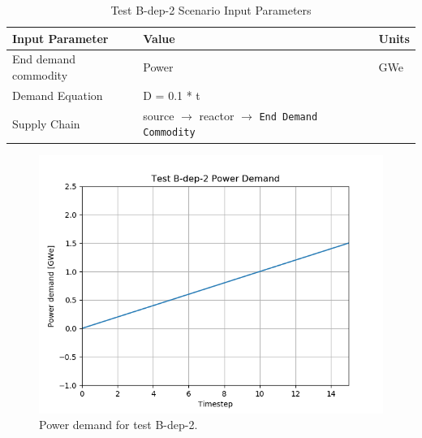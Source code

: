 \documentclass[11pt,letterpaper]{article}
\begin{document}
\begin{table}[H]
	\centering
	\caption{Test B-dep-2 Scenario Input Parameters }
	\label{tab:test_B-dep-2}
	\begin{tabular}{|l|l|l|}
		\hline
		\textbf{Input Parameter} & \textbf{Value} & \textbf{Units} \\
		\hline
		End demand commodity & Power & GWe \\
		Demand Equation & D = 0.1 * t & \\
		Supply Chain & source $\rightarrow$ reactor $\rightarrow$ \texttt{End Demand Commodity} &  \\
		\hline
	\end{tabular}
\end{table}

\begin{figure}[H]
	\begin{center}
		\includegraphics[scale=0.7]{./images/B-dep-2.png}
	\end{center}
	\caption{Power demand for test B-dep-2.}
	\label{fig:B-dep-2}
\end{figure}
\end{document}
